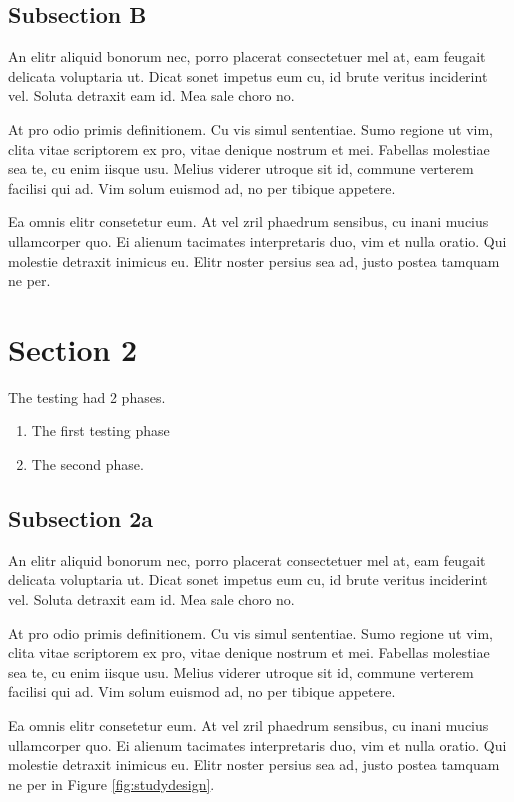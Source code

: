 \subsection{Subsection B}

An elitr aliquid bonorum nec, porro placerat consectetuer mel at, eam feugait delicata voluptaria ut. Dicat sonet impetus eum cu, id brute veritus inciderint vel. Soluta detraxit eam id. Mea sale choro no.

At pro odio primis definitionem. Cu vis simul sententiae. Sumo regione ut vim, clita vitae scriptorem ex pro, vitae denique nostrum et mei. Fabellas molestiae sea te, cu enim iisque usu. Melius viderer utroque sit id, commune verterem facilisi qui ad. Vim solum euismod ad, no per tibique appetere.

Ea omnis elitr consetetur eum. At vel zril phaedrum sensibus, cu inani mucius ullamcorper quo. Ei alienum tacimates interpretaris duo, vim et nulla oratio. Qui molestie detraxit inimicus eu. Elitr noster persius sea ad, justo postea tamquam ne per.





\section{Section 2}

The testing had 2 phases. 
\begin{enumerate}
\item The first testing phase
\item The second phase.
\end{enumerate}
	
\subsection{Subsection 2a}

An elitr aliquid bonorum nec, porro placerat consectetuer mel at, eam feugait delicata voluptaria ut. Dicat sonet impetus eum cu, id brute veritus inciderint vel. Soluta detraxit eam id. Mea sale choro no.

At pro odio primis definitionem. Cu vis simul sententiae. Sumo regione ut vim, clita vitae scriptorem ex pro, vitae denique nostrum et mei. Fabellas molestiae sea te, cu enim iisque usu. Melius viderer utroque sit id, commune verterem facilisi qui ad. Vim solum euismod ad, no per tibique appetere.

Ea omnis elitr consetetur eum. At vel zril phaedrum sensibus, cu inani mucius ullamcorper quo. Ei alienum tacimates interpretaris duo, vim et nulla oratio. Qui molestie detraxit inimicus eu. Elitr noster persius sea ad, justo postea tamquam ne per in Figure \ref{fig:studydesign}.  

